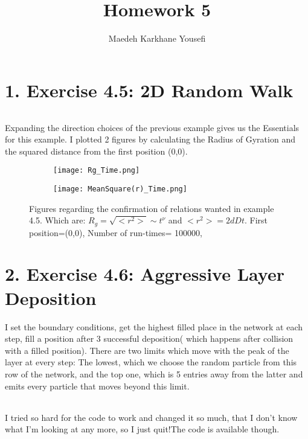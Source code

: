 \documentclass[12pt]{article}
\title{\textbf{Homework 5}}
\author{Maedeh Karkhane Yousefi}
\begin{document}
\maketitle
\part*{1. Exercise 4.5: 2D Random Walk}
\paragraph*{} Expanding the direction choices of the previous example gives us the Essentials for this example. I plotted 2 figures by calculating the Radius of Gyration and the squared distance from the first position (0,0).
\begin{figure}[H]
	\centering
	\begin{subfigure}[t]{0.8\textwidth}
		\texttt{[image: Rg\_Time.png]}
		\label{fig:mesh1.1}
		\caption{}
	\end{subfigure}\par\bigskip 
	\begin{subfigure}[t]{0.8\textwidth}
		\texttt{[image: MeanSquare(r)\_Time.png]}
		\label{fig:mesh1.2}
		\caption{}
	\end{subfigure}
	\label{fig:mesh1}
	\caption{Figures regarding the confirmation of relations wanted in example 4.5. Which are: $R_{g}=\sqrt{<r^{2}>} \sim t^{\nu}$ and $<r^{2}>=2 d D t$. First position=(0,0), Number of run-times= 100000, }
\end{figure}
\part*{2. Exercise 4.6: Aggressive Layer Deposition}
I set the boundary conditions, get the highest filled place in the network at each step, fill a position after 3 successful deposition( which happens after collision with a filled position). There are two limits which move with the peak of the layer at every step: The lowest, which we choose the random particle from this row of the network, and the top one, which is 5 entries away from the latter and emits every particle that moves beyond this limit. 
\paragraph*{}I tried so hard for the code to work and changed it so much, that I don't know what I'm looking at any more, so I just quit!The code is available though. 
\end{document}
